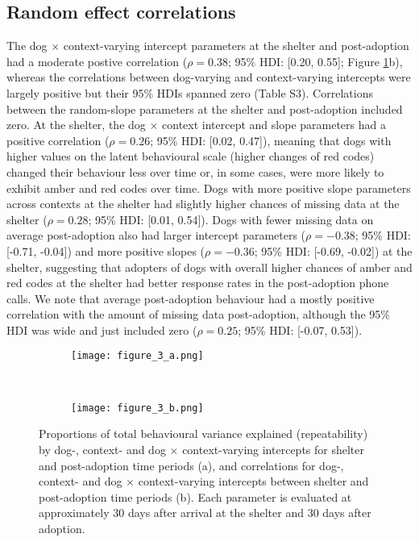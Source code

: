 \documentclass[12pt]{article}
\begin{document}
\subsection{Random effect correlations}
The dog $\times$ context-varying intercept parameters at the shelter and post-adoption had a moderate postive correlation ($\rho = 0.38$; 95\% HDI: [0.20, 0.55]; Figure \ref{fig_corrs_rept}b), whereas the correlations between dog-varying and context-varying intercepts were largely positive but their 95\% HDIs spanned zero (Table S3). Correlations between the random-slope parameters at the shelter and post-adoption included zero. At the shelter, the dog $\times$ context intercept and slope parameters had a positive correlation ($\rho = 0.26$; 95\% HDI: [0.02, 0.47]), meaning that dogs with higher values on the latent behavioural scale (higher changes of red codes) changed their behaviour less over time or, in some cases, were more likely to exhibit amber and red codes over time. Dogs with more positive slope parameters across contexts at the shelter had slightly higher chances of missing data at the shelter ($\rho = 0.28$; 95\% HDI: [0.01, 0.54]). Dogs with fewer missing data on average post-adoption also had larger intercept parameters ($\rho = -0.38$; 95\% HDI: [-0.71, -0.04]) and more positive slopes ($\rho = -0.36$; 95\% HDI: [-0.69, -0.02]) at the shelter, suggesting that adopters of dogs with overall higher chances of amber and red codes at the shelter had better response rates in the post-adoption phone calls. We note that average post-adoption behaviour had a mostly positive correlation with the amount of missing data post-adoption, although the 95\% HDI was wide and just included zero ($\rho = 0.25$; 95\% HDI: [-0.07, 0.53]).

\begin{figure}[t!]
  \centering
  \begin{subfigure}{0.5\textwidth}
    \centering
    \texttt{[image: figure\_3\_a.png]}
  \end{subfigure}%
  ~
  \begin{subfigure}{0.5\textwidth}
    \centering
    \texttt{[image: figure\_3\_b.png]}
  \end{subfigure}
  \caption{Proportions of total behavioural variance explained (repeatability) by dog-, context- and dog $\times$ context-varying intercepts for shelter and post-adoption time periods (a), and correlations for dog-, context- and dog $\times$ context-varying intercepts between shelter and post-adoption time periods (b). Each parameter is evaluated at approximately 30 days after arrival at the shelter and 30 days after adoption.}
  \label{fig_corrs_rept}
\end{figure}
\end{document}
